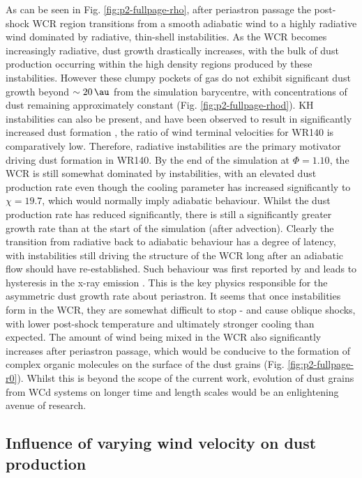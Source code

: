 \documentclass[fleqn,usenatbib]{mnras}
\begin{document}
As can be seen in Fig. \ref{fig:p2-fullpage-rho}, after periastron passage the post-shock WCR region transitions from a smooth adiabatic wind to a highly radiative wind dominated by radiative, thin-shell instabilities.
As the WCR becomes increasingly radiative, dust growth drastically increases, with the bulk of dust production occurring within the high density regions produced by these instabilities.
However these clumpy pockets of gas do not exhibit significant dust growth beyond $\sim \SI{20}{\au}$ from the simulation barycentre, with concentrations of dust remaining approximately constant (Fig. \ref{fig:p2-fullpage-rhod}).
KH instabilities can also be present, and have been observed to result in significantly increased dust formation \citep{eatsonExplorationDustGrain2022}, the ratio of wind terminal velocities for WR140 is comparatively low.
Therefore, radiative instabilities are the primary motivator driving dust formation in WR140.
By the end of the simulation at $\Phi = 1.10$, the WCR is still somewhat dominated by instabilities, with an elevated dust production rate even though the cooling parameter has increased significantly to $\chi = 19.7$, which would normally imply adiabatic behaviour.
Whilst the dust production rate has reduced significantly, there is still a significantly greater growth rate than at the start of the simulation (after advection).
Clearly the transition from radiative back to adiabatic behaviour has a degree of latency, with instabilities still driving the structure of the WCR long after an adiabatic flow should have re-established.
Such behaviour was first reported by \cite{pittard_3d_2009} and leads to hysteresis in the x-ray emission \citep{pittard_3d_2010}.
This is the key physics responsible for the asymmetric dust growth rate about periastron.
It seems that once instabilities form in the WCR, they are somewhat difficult to stop - and cause oblique shocks, with lower post-shock temperature and ultimately stronger cooling than expected.
The amount of wind being mixed in the WCR also significantly increases after periastron passage, which would be conducive to the formation of complex organic molecules on the surface of the dust grains (Fig. \ref{fig:p2-fullpage-r0}).
Whilst this is beyond the scope of the current work, evolution of dust grains from WCd systems on longer time and length scales would be an enlightening avenue of research.

\subsection{Influence of varying wind velocity on dust production}
\end{document}
